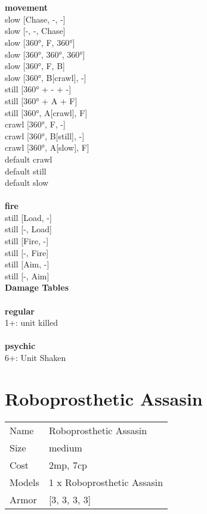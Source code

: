 
\ \\




\ \\ {\bf movement } \\
slow [Chase, -, -] \\
slow [-, -, Chase] \\
slow [360°, F, 360°] \\
slow [360°, 360°, 360°] \\
slow [360°, F, B] \\
slow [360°, B[crawl], -] \\
still [360° + - + -] \\
still [360° + A + F] \\
still [360°, A[crawl], F] \\
crawl [360°, F, -] \\
crawl [360°, B[still], -] \\
crawl [360°, A[slow], F] \\
default crawl \\
default still \\
default slow \\
\ \\ {\bf fire } \\
still [Load, -] \\
still [-, Load] \\
still [Fire, -] \\
still [-, Fire] \\
still [Aim, -] \\
still [-, Aim] \\


{\bf Damage Tables} \\
\ \\ {\bf regular } \\
1+: unit killed \\
\ \\ {\bf psychic } \\
6+: Unit Shaken \\










\pagebreak\pagebreak

\section{ Roboprosthetic Assasin }

\begin{tabular}{ll}
  Name & Roboprosthetic Assasin \\
  Size & medium\\
  Cost & 2mp, 7cp\\
  Models & 1 x Roboprosthetic Assasin\\
  Armor & [3, 3, 3, 3]\\
\end{tabular}

